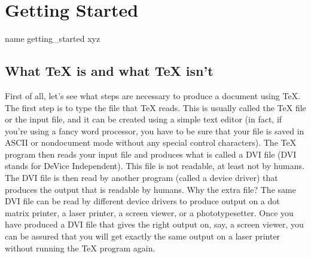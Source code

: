 \ifwritinganswers 
\fi 
 
 
 
\section{Getting Started} 
\pdfdest name {getting_started} xyz

\subsection{What \TeX{} is and what \TeX{} isn't} 

First of all, let's see what steps are necessary to produce a 
document using \TeX\null.  The first step is to type the file 
that \TeX{} reads. This is usually called the \TeX{} file or the 
input file, and it can be created using a simple text editor (in 
fact, if you're using a fancy word processor, you have to be sure 
that your file is saved in ASCII or nondocument mode without any 
special control characters). The \TeX{} program then reads your 
input file and produces what is called a DVI file (DVI stands for 
DeVice Independent). This file is not readable, at least not by 
humans. The DVI file is then read by another program (called a 
device driver) that produces the output that is readable by 
humans. Why the extra file? The same DVI file can be 
read by different device drivers to produce output on a dot 
matrix printer, a laser printer, a screen viewer, or a 
phototypesetter. Once you have produced a DVI file that gives 
the right output on, say, a screen viewer, you can be assured 
that you will get exactly the same output on a laser printer 
without running the \TeX{} program again. 

